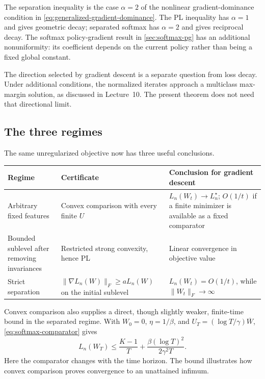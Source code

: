 \documentclass[11pt,twoside]{article}
\theoremstyle{definition}
\theoremstyle{remark}
\begin{document}
The separation inequality is the case $\alpha=2$ of the nonlinear
gradient-dominance condition in
\cref{eq:generalized-gradient-dominance}. The PL inequality has
$\alpha=1$ and gives geometric decay; separated softmax has $\alpha=2$ and
gives reciprocal decay. The softmax policy-gradient result in
\cref{sec:softmax-pg} has an additional nonuniformity: its coefficient depends
on the current policy rather than being a fixed global constant.

The direction selected by gradient descent is a separate question from loss
decay. Under additional conditions, the normalized iterates approach a
multiclass max-margin solution, as discussed in Lecture~10. The present
theorem does not need that directional limit.

\subsection{The three regimes}

The same unregularized objective now has three useful conclusions.

\begin{center}
\renewcommand{\arraystretch}{1.25}
\begin{tabular}{@{}>{\raggedright\arraybackslash}p{}
                    >{\raggedright\arraybackslash}p{}
                    >{\raggedright\arraybackslash}p{}@{}}
\toprule
Regime & Certificate & Conclusion for gradient descent\\
\midrule
Arbitrary fixed features
& Convex comparison with every finite $U$
& $L_n(W_t)\to L_n^\star$; $O(1/t)$ if a finite minimizer is available as a
fixed comparator\\
Bounded sublevel after removing invariances
& Restricted strong convexity, hence PL
& Linear convergence in objective value\\
Strict separation
& $\|\nabla L_n(W)\|_F\ge aL_n(W)$ on the initial sublevel
& $L_n(W_t)=O(1/t)$, while $\|W_t\|_F\to\infty$\\
\bottomrule
\end{tabular}
\end{center}

Convex comparison also supplies a direct, though slightly weaker, finite-time
bound in the separated regime. With $W_0=0$, $\eta=1/\beta$, and
$U_T=(\log T/\gamma)\overline W$, \cref{eq:softmax-comparator} gives
\begin{equation}
 L_n(W_T)
 \le\frac{K-1}{T}
 +\frac{\beta(\log T)^2}{2\gamma^2T}.
 \label{eq:separable-comparator-rate}
\end{equation}
Here the comparator changes with the time horizon. The bound illustrates how
convex comparison proves convergence to an unattained infimum.
\end{document}

